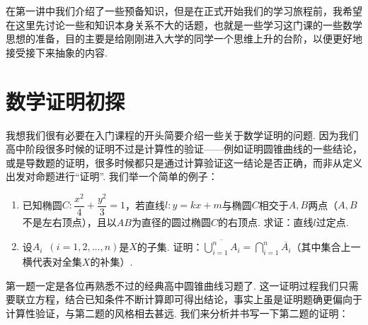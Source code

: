 \newcommand{\suc}{\operatorname{suc}}

在第一讲中我们介绍了一些预备知识，但是在正式开始我们的学习旅程前，我希望在这里先讨论一些和知识本身关系不大的话题，也就是一些学习这门课的一些数学思想的准备，目的主要是给刚刚进入大学的同学一个思维上升的台阶，以便更好地接受接下来抽象的内容.

\section{数学证明初探}

我想我们很有必要在入门课程的开头简要介绍一些关于数学证明的问题. 因为我们高中阶段很多时候的证明不过是计算性的验证——例如证明圆锥曲线的一些结论，或是导数题的证明，很多时候都只是通过计算验证这一结论是否正确，而非从定义出发对命题进行``证明''. 我们举一个简单的例子：

\begin{example}{}{}
    \begin{enumerate}
        \item 已知椭圆$C:\dfrac{x^2}{4}+\dfrac{y^2}{3}=1$，若直线$l\colon y=kx+m$与椭圆$C$相交于$A,B$两点（$A,B$不是左右顶点），且以$AB$为直径的圆过椭圆$C$的右顶点. 求证：直线$l$过定点.

        \item 设$A_i\enspace(i=1,2,\ldots,n)$是$X$的子集. 证明：$\overline{\displaystyle\bigcup_{i=1}^nA_i}=\bigcap_{i=1}^n\overline{A_i}$（其中集合上一横代表对全集$X$的补集）.
    \end{enumerate}
\end{example}

第一题一定是各位再熟悉不过的经典高中圆锥曲线习题了. 这一证明过程我们只需要联立方程，结合已知条件不断计算即可得出结论，事实上虽是证明题确更偏向于计算性验证，与第二题的风格相去甚远. 我们来分析并书写一下第二题的证明：


